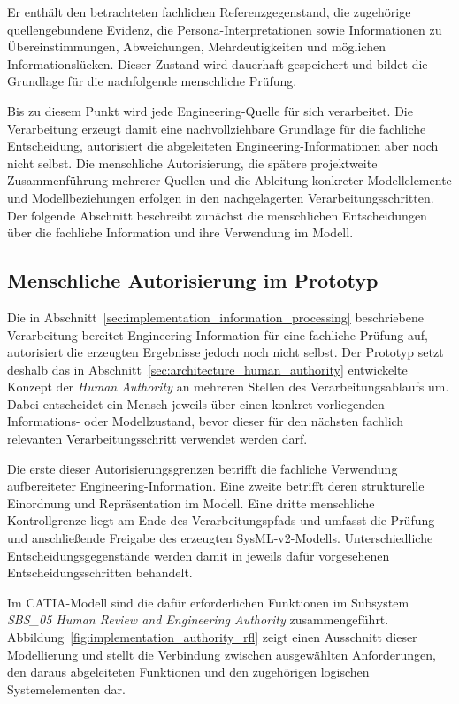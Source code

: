 \noindent Er enthält den betrachteten
fachlichen Referenzgegenstand, die zugehörige quellengebundene Evidenz, die
Persona-Interpretationen sowie Informationen zu Übereinstimmungen,
Abweichungen, Mehrdeutigkeiten und möglichen Informationslücken. Dieser
Zustand wird dauerhaft gespeichert und bildet die Grundlage für die
nachfolgende menschliche Prüfung.

Bis zu diesem Punkt wird jede Engineering-Quelle für sich verarbeitet. Die
Verarbeitung erzeugt damit eine nachvollziehbare Grundlage für die
fachliche Entscheidung, autorisiert die abgeleiteten Engineering-Informationen
aber noch nicht selbst. Die menschliche Autorisierung, die spätere
projektweite Zusammenführung mehrerer Quellen und die Ableitung konkreter
Modellelemente und Modellbeziehungen erfolgen in den nachgelagerten
Verarbeitungsschritten. Der folgende Abschnitt beschreibt zunächst die
menschlichen Entscheidungen über die fachliche Information und ihre
Verwendung im Modell.

\subsection{Menschliche Autorisierung im Prototyp}
\label{sec:implementation_authority}

Die in Abschnitt~\ref{sec:implementation_information_processing}
beschriebene Verarbeitung bereitet Engineering-Information für eine
fachliche Prüfung auf, autorisiert die erzeugten Ergebnisse jedoch noch
nicht selbst. Der Prototyp setzt deshalb das in
Abschnitt~\ref{sec:architecture_human_authority} entwickelte Konzept der
\emph{Human Authority} an mehreren Stellen des Verarbeitungsablaufs um.
Dabei entscheidet ein Mensch jeweils über einen konkret vorliegenden
Informations- oder Modellzustand, bevor dieser für den nächsten fachlich
relevanten Verarbeitungsschritt verwendet werden darf.

Die erste dieser Autorisierungsgrenzen betrifft die fachliche Verwendung
aufbereiteter Engineering-Information. Eine zweite betrifft deren
strukturelle Einordnung und Repräsentation im Modell. Eine dritte
menschliche Kontrollgrenze liegt am Ende des Verarbeitungspfads und umfasst
die Prüfung und anschließende Freigabe des erzeugten SysML-v2-Modells.
Unterschiedliche Entscheidungsgegenstände werden damit in jeweils dafür
vorgesehenen Entscheidungsschritten behandelt.

Im CATIA-Modell sind die dafür erforderlichen Funktionen im Subsystem
\emph{SBS\_05 Human Review and Engineering Authority} zusammengeführt.
Abbildung~\ref{fig:implementation_authority_rfl} zeigt einen Ausschnitt
dieser Modellierung und stellt die Verbindung zwischen ausgewählten
Anforderungen, den daraus abgeleiteten Funktionen und den zugehörigen
logischen Systemelementen dar.

